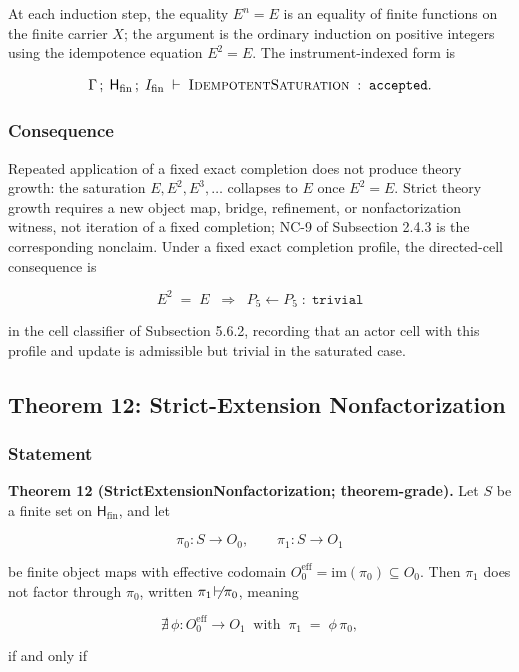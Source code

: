 \documentclass[11pt]{article}
\providecommand{\factor}{\mathrel{\!\vdash\!}}
\theoremstyle{definition}
\begin{document}
At each induction step, the equality \(E^n=E\) is an equality of finite functions on the finite carrier \(X\); the argument is the ordinary induction on positive integers using the idempotence equation \(E^2=E\). The instrument-indexed form is

\[
\Gamma\,;\;\mathsf H_{\mathrm{fin}}\,;\;I_{\mathrm{fin}}\;\vdash\;\textsc{IdempotentSaturation}\;:\;\texttt{accepted}.
\]

\subsubsection{Consequence}

Repeated application of a fixed exact completion does not produce theory growth: the saturation \(E,E^2,E^3,\ldots\) collapses to \(E\) once \(E^2=E\). Strict theory growth requires a new object map, bridge, refinement, or nonfactorization witness, not iteration of a fixed completion; NC-9 of Subsection 2.4.3 is the corresponding nonclaim. Under a fixed exact completion profile, the directed-cell consequence is

\[
E^2\;=\;E\;\;\Longrightarrow\;\;P_5\leftarrow P_5\;:\;\texttt{trivial}
\]

in the cell classifier of Subsection 5.6.2, recording that an actor cell with this profile and update is admissible but trivial in the saturated case.

\subsection{Theorem 12: Strict-Extension Nonfactorization}

\subsubsection{Statement}

\textbf{Theorem 12 (StrictExtensionNonfactorization; theorem-grade).} Let \(S\) be a finite set on \(\mathsf H_{\mathrm{fin}}\), and let

\[
\pi_0\colon S\to O_0,\qquad \pi_1\colon S\to O_1
\]

be finite object maps with effective codomain \(O_0^{\mathrm{eff}}=\mathrm{im}(\pi_0)\subseteq O_0\). Then \(\pi_1\) does not factor through \(\pi_0\), written \(\pi_1\not\factor\pi_0\), meaning

\[
\nexists\,\phi\colon O_0^{\mathrm{eff}}\to O_1\;\;\text{with}\;\;\pi_1\;=\;\phi\,\pi_0,
\]

if and only if
\end{document}
